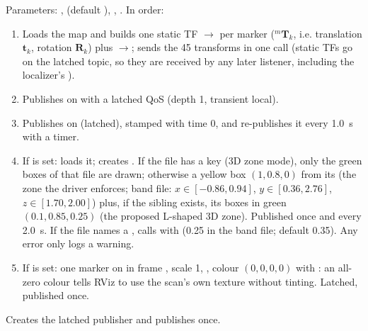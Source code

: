 Parameters: ,  (default \code{[0.05, 0.0, 0.0]}), ,
. In order:
\begin{enumerate}
\item Loads the map and builds one static TF $\to$ per marker (${}^m\mathbf T_k$, i.e.
  translation $\mathbf t_k$, rotation $\mathbf R_k$) plus $\to$; sends the
  45 transforms in one  call (static TFs go on the latched
   topic, so they are received by any later listener, including the localizer's
  ).
\item Publishes  on  with a latched QoS (depth 1, transient local).
\item Publishes  on  (latched), stamped with time 0, and re-publishes
  it every 1.0~s with a timer.
\item If  is set: loads it; creates . If the file has a 
  key (3D zone mode), only the green boxes of that file are drawn; otherwise a yellow box $(1,0.8,0)$ from its
   (the zone the driver enforces; band file: $x\in[-0.86,0.94]$, $y\in[0.36,2.76]$,
  $z\in[1.70,2.00]$) plus, if the sibling  exists, its boxes in green $(0.1,0.85,0.25)$
  (the proposed L-shaped 3D zone). Published once and every 2.0~s. If the file names a , calls
   with  (0.25 in the band file; default 0.35). Any error only logs a warning.
\item If  is set: one  marker on  in frame , scale 1,
  , colour $(0,0,0,0)$ with : an
  all-zero colour tells RViz to use the scan's own texture without tinting. Latched, published once.
\end{enumerate}

Creates the latched  publisher and publishes  once.

